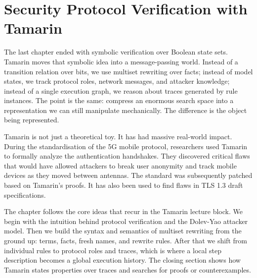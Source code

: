 
\chapter{Security Protocol Verification with Tamarin}
\label{ch:tamarin}


The last chapter ended with symbolic verification over Boolean state sets.
Tamarin moves that symbolic idea into a message-passing world.  Instead of a
transition relation over bits, we use multiset rewriting over facts; instead
of model states, we track protocol roles, network messages, and attacker
knowledge; instead of a single execution graph, we reason about traces
generated by rule instances.  The point is the same: compress an enormous
search space into a representation we can still manipulate mechanically.  The
difference is the object being represented.

Tamarin is not just a theoretical toy. It has had massive real-world impact. During the standardisation of the 5G mobile protocol, researchers used Tamarin to formally analyze the authentication handshakes. They discovered critical flaws that would have allowed attackers to break user anonymity and track mobile devices as they moved between antennas. The standard was subsequently patched based on Tamarin's proofs. It has also been used to find flaws in TLS 1.3 draft specifications.

The chapter follows the core ideas that recur in the Tamarin lecture block.
We begin with the intuition behind protocol verification and the Dolev-Yao
attacker model.  Then we build the syntax and semantics of multiset rewriting
from the ground up: terms, facts, fresh names, and rewrite rules.  After that
we shift from individual rules to protocol roles and traces, which is where a
local step description becomes a global execution history.  The closing section
shows how Tamarin states properties over traces and searches for proofs or
counterexamples.

